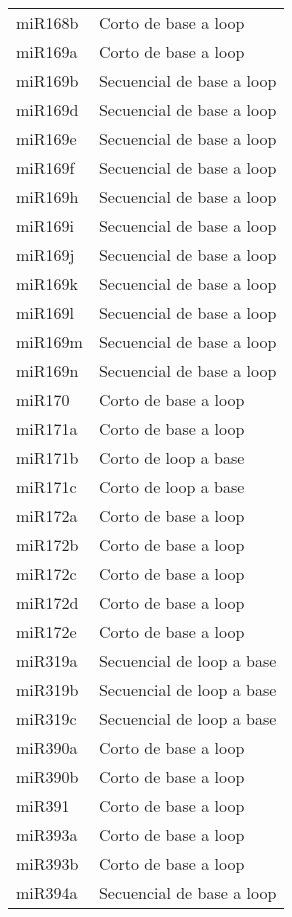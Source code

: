 \begin{table}[]
\begin{tabular}{ll}
miR168b        & Corto de base a loop      \\
miR169a        & Corto de base a loop      \\
miR169b        & Secuencial de base a loop \\
miR169d        & Secuencial de base a loop \\
miR169e        & Secuencial de base a loop \\
miR169f        & Secuencial de base a loop \\
miR169h        & Secuencial de base a loop \\
miR169i        & Secuencial de base a loop \\
miR169j        & Secuencial de base a loop \\
miR169k        & Secuencial de base a loop \\
miR169l        & Secuencial de base a loop \\
miR169m        & Secuencial de base a loop \\
miR169n        & Secuencial de base a loop \\
miR170         & Corto de base a loop      \\
miR171a        & Corto de base a loop      \\
miR171b        & Corto de loop a base      \\
miR171c        & Corto de loop a base      \\
miR172a        & Corto de base a loop      \\
miR172b        & Corto de base a loop      \\
miR172c        & Corto de base a loop      \\
miR172d        & Corto de base a loop      \\
miR172e        & Corto de base a loop      \\
miR319a        & Secuencial de loop a base \\
miR319b        & Secuencial de loop a base \\
miR319c        & Secuencial de loop a base \\
miR390a        & Corto de base a loop      \\
miR390b        & Corto de base a loop      \\
miR391         & Corto de base a loop      \\
miR393a        & Corto de base a loop      \\
miR393b        & Corto de base a loop      \\
miR394a        & Secuencial de base a loop \\

\end{tabular}
\end{table}

